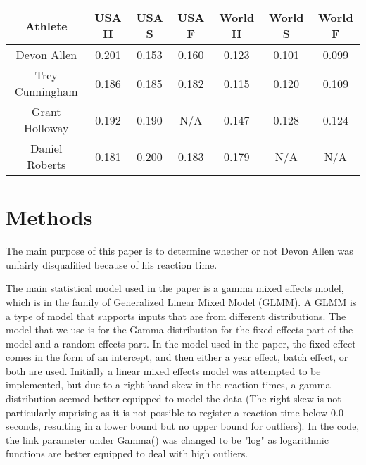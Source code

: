 \documentclass[12pt, letterpaper, titlepage]{article}
\begin{document}
\begin{center}
  \begin{tabular}{||c | c c c | c c c||} 
   \hline
   Athlete & USA H & USA S & USA F & World H & World S & World F \\ [0.5ex] 
   \hline\hline
   Devon Allen & 0.201 & 0.153 & 0.160 & 0.123 & 0.101 & 0.099 \\ 
   \hline
   Trey Cunningham & 0.186 & 0.185 & 0.182 & 0.115 & 0.120 & 0.109 \\
   \hline
   Grant Holloway & 0.192 & 0.190 & N/A & 0.147 & 0.128 & 0.124 \\
   \hline
   Daniel Roberts & 0.181 & 0.200 & 0.183 & 0.179 & N/A & N/A \\ [0.5ex]
   \hline
  \end{tabular}
  \end{center}


\section{Methods}
\label{sec:methods}
The main purpose of this paper is to determine whether or not Devon Allen was
unfairly disqualified because of his reaction time. 

The main statistical model used in the paper is a gamma mixed effects model, which is
in the family of Generalized Linear Mixed Model (GLMM).  A GLMM is a type of model that
supports inputs that are from different distributions.  The model that we use is for the
Gamma distribution for the fixed effects part of the model and a random effects part.  In
the model used in the paper, the fixed effect comes in the form of an intercept, and then
either a year effect, batch effect, or both are used.  Initially a linear mixed effects
model was attempted to be implemented, but due to a right hand skew in the reaction times, a gamma distribution seemed better equipped to model the data (The right
skew is not particularly suprising as it is not possible to register a reaction time below 0.0 seconds, resulting in a lower bound but no upper bound for outliers). In the code, the link parameter under Gamma() was changed to be "log" as logarithmic functions are better equipped to deal with high outliers. 
\end{document}
